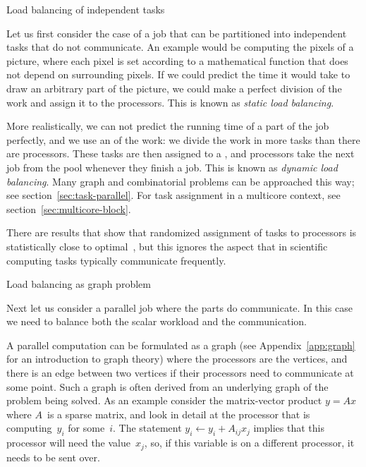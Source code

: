  {Load balancing of independent tasks}

Let us first consider the case of a job that can be partitioned into
independent tasks that do not communicate. An example would be
computing the pixels of a  picture, where
each pixel is set according to a mathematical function that does not
depend on surrounding pixels. If we could predict the time it would
take to draw an arbitrary part of the picture, we could make a perfect
division of the work and assign it to the processors. This is known as
\emph{static load balancing}.

More realistically, we can not predict the running time of a part of
the job perfectly, and we use an  of the
work: we divide the work in more tasks than there are
processors. These tasks are then assigned to a ,
and processors take the next job from the pool whenever they finish a
job. This is known as \emph{dynamic load
  balancing}. Many graph and
combinatorial problems can be approached this way; see
section~\ref{sec:task-parallel}. For task assignment in a multicore
context, see section~\ref{sec:multicore-block}.

There are results that show that randomized assignment of tasks to
processors is statistically close to optimal~\cite{KarpZhang88}, but
this ignores the aspect that in scientific computing tasks typically
communicate frequently.

 {Load balancing as graph problem}
\label{sec:graph-loadbalancing}

Next let us consider a parallel job where the parts do communicate. In
this case we need to balance both the scalar workload and the
communication.

A parallel computation can be formulated as a graph (see
Appendix~\ref{app:graph} for an introduction to graph theory) where the
processors are the vertices, and there is an edge between two vertices
if their processors need to communicate at some point. Such a graph is
often derived from an underlying graph of the problem being solved.
As an example consider the matrix-vector product $y=Ax$ where
$A$~is a sparse matrix, and look in detail at the processor that is
computing~$y_i$ for some~$i$. The statement $y_i\leftarrow y_i+A_{ij}x_j$
implies that this processor will need the value~$x_j$, so, if this
variable is on a different processor, it needs to be sent over.

